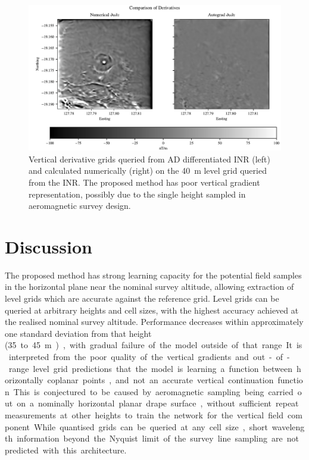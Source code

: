 \begin{figure}[hbtp]
    \centering{}
    \includegraphics[width=1.0\linewidth]{fig/p3/P864_dv_comparison.pdf}
    \caption[Vertical derivative]{Vertical derivative grids queried from AD differentiated INR (left) and calculated numerically (right) on the \qty{40}{\m} level grid queried from the INR\@.
     The proposed method has poor vertical gradient representation, possibly due to the single height sampled in aeromagnetic survey design.}
    \label{fig:vertgrad}
\end{figure}

\section{Discussion}
\label{sec:3discussion}
The proposed method has strong learning capacity for the potential field samples in the horizontal plane near the nominal survey altitude, allowing extraction of level grids which are accurate against the reference grid.
Level grids can be queried at arbitrary heights and cell sizes, with the highest accuracy achieved at the realised nominal survey altitude.
Performance decreases within approximately one standard deviation from that height (\qty{35} to \qty{45}{\m}), with gradual failure of the model outside of that range.
It is interpreted from the poor quality of the vertical gradients and out-of-range level grid predictions that the model is learning a function between horizontally coplanar points, and not an accurate vertical continuation function.
This is conjectured to be caused by aeromagnetic sampling being carried out on a nominally horizontal planar drape surface, without sufficient repeat measurements at other heights to train the network for the vertical field component.

While quantised grids can be queried at any cell size, short wavelength information beyond the Nyquist limit of the survey line sampling are not predicted with this architecture.

